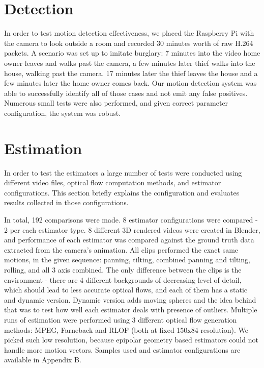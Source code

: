 \documentclass[11pt,english]{report}
\begin{document}
\section{Detection}

In order to test motion detection effectiveness, we placed the Raspberry Pi with the camera to look outside a room and recorded 30 minutes worth of raw H.264 packets. A scenario was set up to imitate burglary: 7 minutes into the video home owner leaves and walks past the camera, a few minutes later thief walks into the house, walking past the camera. 17 minutes later the thief leaves the house and a few minutes later the home owner comes back. Our motion detection system was able to successfully identify all of those cases and not emit any false positives. Numerous small tests were also performed, and given correct parameter configuration, the system was robust.

\section{Estimation}

In order to test the estimators a large number of tests were conducted using different video files, optical flow computation methods, and estimator configurations. This section briefly explains the configuration and evaluates results collected in those configurations.

In total, 192 comparisons were made. 8 estimator configurations were compared - 2 per each estimator type. 8 different 3D rendered videos were created in Blender, and performance of each estimator was compared against the ground truth data extracted from the camera's animation. All clips performed the exact same motions, in the given sequence: panning, tilting, combined panning and tilting, rolling, and all 3 axis combined. The only difference between the clips is the environment - there are 4 different backgrounds of decreasing level of detail, which should lead to less accurate optical flows, and each of them has a static and dynamic version. Dynamic version adds moving spheres and the idea behind that was to test how well each estimator deals with presence of outliers. Multiple runs of estimation were performed using 3 different optical flow generation methods: MPEG, Farneback and RLOF (both at fixed 150x84 resolution). We picked such low resolution, because epipolar geometry based estimators could not handle more motion vectors. Samples used and estimator configurations are available in Appendix B.
\end{document}
